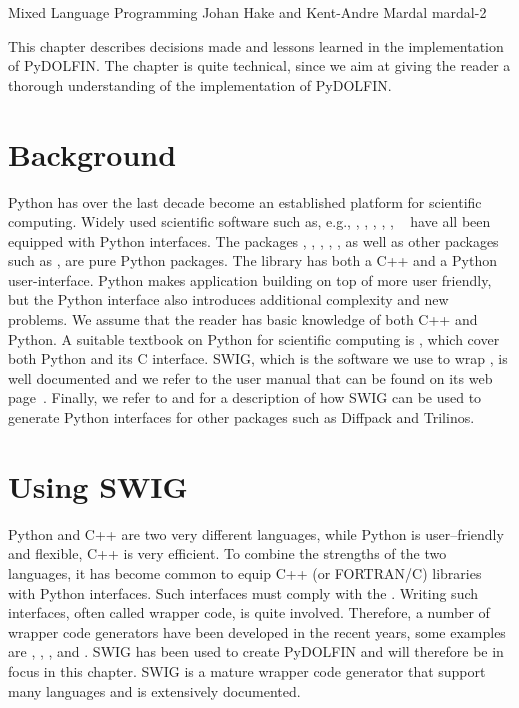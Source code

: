               {Mixed Language Programming}
              {Johan Hake and Kent-Andre Mardal}
              {mardal-2}


This chapter describes decisions made and lessons learned
in the implementation of PyDOLFIN. The chapter is quite technical, since
we aim at giving the reader a thorough understanding of the implementation
of PyDOLFIN. 

\section{Background}
Python has over the last decade become an established platform
for scientific computing. Widely used scientific software such as, e.g.,
\citet{www:petsc}, \citet{www:hypre},
\citet{www:trilinos}, \citet{www:vtk}, \citet{www:vmtk},
\ginac~\citep{BauerFrinkKreckel2000} have all been equipped with Python
interfaces. The \fenics
packages \ferari, \fiat , \ffc,
\ufl, \viper, as well as  other packages such as 
\sympy\citep{CertikSeoanePetersonEtAl2009},
\scipy\citep{JonesOliphantPetersonEtAl2009} are pure Python packages.
The \dolfin library has both a C++ and a Python user-interface. Python
makes application building on top of \dolfin more user friendly, but
the Python interface also introduces additional complexity and new
problems.  We assume that the reader has basic knowledge of both C++
and Python. A suitable textbook on Python for scientific computing is
\citet{Langtangen2008}, which cover both Python and its C interface.
SWIG, which is the software we use to wrap \dolfin, is well documented and we refer to the user manual that can be
found on its web page~\citet{www:swig}. Finally, we refer to
\citet{Langtangen2003b} and \citet{SalaSpotzHeroux2008} for a
description of how SWIG can be used to generate Python interfaces for
other packages such as Diffpack and Trilinos.


\section{Using SWIG}

Python and C++ are two very different languages, while Python is
user--friendly and flexible, C++ is very efficient. 
To combine the strengths of the two languages, it has become common
to equip C++ (or FORTRAN/C) libraries with Python interfaces. 
Such interfaces must comply with the \citet{www:python-capi}.   
Writing such interfaces, often called wrapper code, is quite involved.
Therefore, a number of wrapper code generators have been developed in the
recent years, some examples are
 \citet{Peterson}, \citet{SIP}, \citet{Siloon}, and \citet{www:swig}. 
 SWIG has been used to create PyDOLFIN and will therefore be in focus in
 this chapter. SWIG is a mature wrapper code generator that support many languages and is extensively documented.

